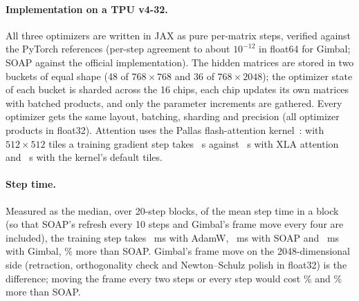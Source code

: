 \paragraph{Implementation on a TPU v4-32.} All three optimizers are written in JAX
\citep{bradbury2018jax} as pure per-matrix steps, verified against the PyTorch references (per-step
agreement to about $10^{-12}$ in float64 for Gimbal; SOAP against the official implementation). The
hidden matrices are stored in two buckets of equal shape (48 of $768\times768$ and 36 of
$768\times2048$); the optimizer state of each bucket is sharded across the 16 chips, each chip
updates its own matrices with batched products, and only the parameter increments are gathered.
Every optimizer gets the same layout, batching, sharding and precision (all optimizer products in
float32). Attention uses the Pallas flash-attention kernel~\citep{dao2022flashattention}: with
$512\times512$ tiles a training gradient step takes \AttnFlashTuned{}~s against \AttnXla{}~s with
XLA attention and \AttnFlashDefault{}~s with the kernel's default tiles.

\paragraph{Step time.} Measured as the median, over 20-step blocks, of the mean step time in a
block (so that SOAP's refresh every 10 steps and Gimbal's frame move every four are included),
the training step takes \StepAdamw{}~ms with AdamW, \StepSoap{}~ms with SOAP and \StepGimbal{}~ms
with Gimbal, \StepGimbalOverSoap\% more than SOAP. Gimbal's frame move on the 2048-dimensional side
(retraction, orthogonality check and Newton--Schulz polish in float32) is the difference; moving the
frame every two steps or every step would cost \StepKtwoOverSoap\% and \StepKoneOverSoap\% more
than SOAP.

